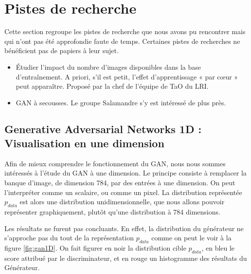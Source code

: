 \section{Pistes de recherche}
Cette section regroupe les pistes de recherche que nous avons pu rencontrer mais qui n'ont pas été approfondie faute de temps. Certaines pistes de recherches ne bénéficient pas de papiers à leur sujet.
\begin{itemize}
\item Étudier l’impact du nombre d’images disponibles dans la base d’entraînement. A priori, s’il est petit, l’effet d’apprentissage « par cœur » peut apparaître. Proposé par la chef de l’équipe de TaO du LRI.
\item GAN à secousses. Le groupe Salamandre \cite{bouvier_dyvoire_dessine-moi_2018} s'y est intéressé de plus près.
\end{itemize}

\subsection{Generative Adversarial Networks 1D : Visualisation en une dimension}
\label{gan1D}
Afin de mieux comprendre le fonctionnement du GAN, nous nous sommes intéressés à l'étude du GAN à une dimension.  Le principe consiste à remplacer la banque d'image, de dimension 784, par des entrées à une dimension. On peut l'interpréter comme un scalaire, ou comme un pixel. La distribution représentée $p_{data}$ est alors une distribution unidimensionnelle, que nous allons pouvoir représenter graphiquement, plutôt qu'une distribution à 784 dimensions.

Les résultats ne furent pas concluants. En effet, la distribution du générateur ne s'approche pas du tout de la représentation $p_{data}$ comme on peut le voir à la figure \ref{fig:gan1D}. On fait figurer en noir la distribution cible $p_{data}$, en bleu le score attribué par le discriminateur, et en rouge un histogramme des résultats du Générateur.

